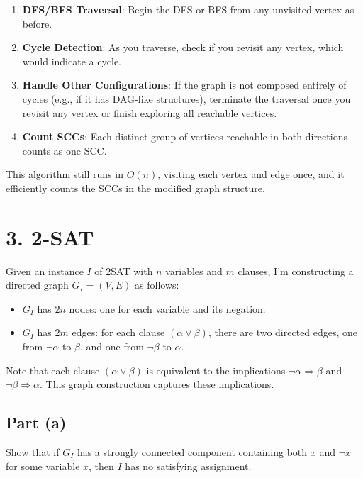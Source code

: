 \documentclass[11pt]{article}
\begin{document}
\begin{enumerate}
    \item \textbf{DFS/BFS Traversal}: Begin the DFS or BFS from any unvisited vertex as before.
    \item \textbf{Cycle Detection}: As you traverse, check if you revisit any vertex, which would indicate a cycle.
    \item \textbf{Handle Other Configurations}: If the graph is not composed entirely of cycles (e.g., if it has DAG-like structures), terminate the traversal once you revisit any vertex or finish exploring all reachable vertices.
    \item \textbf{Count SCCs}: Each distinct group of vertices reachable in both directions counts as one SCC.
\end{enumerate}

This algorithm still runs in \( O(n) \), visiting each vertex and edge once, and it efficiently counts the SCCs in the modified graph structure.



\newpage
\section*{3. 2-SAT}

 Given an instance \( I \) of 2SAT with \( n \) variables and \( m \) clauses, I'm constructing a directed graph \( G_I = (V, E) \) as follows:

\begin{itemize}
    \item \( G_I \) has \( 2n \) nodes: one for each variable and its negation.
    \item \( G_I \) has \( 2m \) edges: for each clause \( (\alpha \vee \beta) \), there are two directed edges, one from \( \neg \alpha \) to \( \beta \), and one from \( \neg \beta \) to \( \alpha \).
\end{itemize}

Note that each clause \( (\alpha \vee \beta) \) is equivalent to the implications \( \neg \alpha \Rightarrow \beta \) and \( \neg \beta \Rightarrow \alpha \). This graph construction captures these implications.

\subsection*{Part (a)}
Show that if \( G_I \) has a strongly connected component containing both \( x \) and \( \neg x \) for some variable \( x \), then \( I \) has no satisfying assignment.
\end{document}
